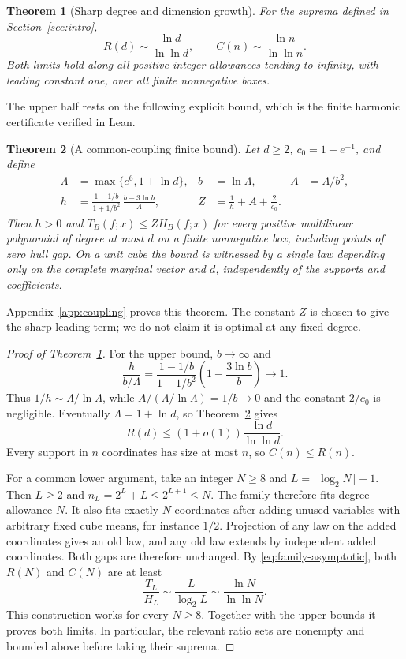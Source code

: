 \documentclass[11pt]{article}
\newtheorem{theorem}{Theorem}
\theoremstyle{remark}
\begin{document}
\begin{theorem}[Sharp degree and dimension growth]\label{thm:sharp}
For the suprema defined in Section~\ref{sec:intro},
\begin{equation}\label{eq:sharp}
 R(d)\sim\frac{\ln d}{\ln\ln d},\qquad
 C(n)\sim\frac{\ln n}{\ln\ln n}.
\end{equation}
Both limits hold along all positive integer allowances tending to
infinity, with leading constant one, over all finite nonnegative boxes.
\end{theorem}

The upper half rests on the following explicit bound, which is the
finite harmonic certificate verified in Lean.

\begin{theorem}[A common-coupling finite bound]\label{thm:finite-upper}
Let $d\ge2$, $c_0=1-e^{-1}$, and define
\begin{align}
 \Lambda&=\max\{e^6,1+\ln d\},& b&=\ln\Lambda,& A&=\Lambda/b^2,
       \label{eq:upper-parameters}\\
 h&=\frac{1-1/b}{1+1/b^2}\,
          \frac{b-3\ln b}{\Lambda},&
 Z&=\frac1h+A+\frac2{c_0}.\label{eq:upper-constant}
\end{align}
Then $h>0$ and $T_B(f;x)\le ZH_B(f;x)$ for every positive multilinear
polynomial of degree at most $d$ on a finite nonnegative box, including
points of zero hull gap. On a unit cube the bound is witnessed by a
single law depending only on the complete marginal vector and $d$,
independently of the supports and coefficients.
\end{theorem}

Appendix~\ref{app:coupling} proves this theorem. The constant $Z$ is
chosen to give the sharp leading term; we do not claim it is optimal at
any fixed degree.

\begin{proof}[Proof of Theorem~\ref{thm:sharp}]
For the upper bound, $b\to\infty$ and
\[
 \frac{h}{b/\Lambda}
   =\frac{1-1/b}{1+1/b^2}\left(1-\frac{3\ln b}{b}\right)
      \longrightarrow1.
\]
Thus $1/h\sim\Lambda/\ln\Lambda$, while
$A/(\Lambda/\ln\Lambda)=1/b\to0$ and the constant $2/c_0$ is
negligible. Eventually $\Lambda=1+\ln d$, so Theorem~\ref{thm:finite-upper}
gives
\[
 R(d)\le(1+o(1))\frac{\ln d}{\ln\ln d}.
\]
Every support in $n$ coordinates has size at most $n$, so $C(n)\le R(n)$.

For a common lower argument, take an integer $N\ge8$ and
$L=\lfloor\log_2N\rfloor-1$. Then $L\ge2$ and
$n_L=2^L+L\le2^{L+1}\le N$. The family therefore fits degree allowance
$N$. It also fits exactly $N$ coordinates after adding unused variables
with arbitrary fixed cube means, for instance $1/2$. Projection of any
law on the added coordinates gives an old law, and any old law extends
by independent added coordinates. Both gaps are therefore unchanged.
By \eqref{eq:family-asymptotic}, both $R(N)$ and $C(N)$ are at least
\[
 \frac{T_L}{H_L}\sim\frac{L}{\log_2L}
     \sim\frac{\ln N}{\ln\ln N}.
\]
This construction works for every $N\ge8$. Together with the upper
bounds it proves both limits. In particular, the relevant ratio sets
are nonempty and bounded above before taking their suprema.
\end{proof}
\end{document}
